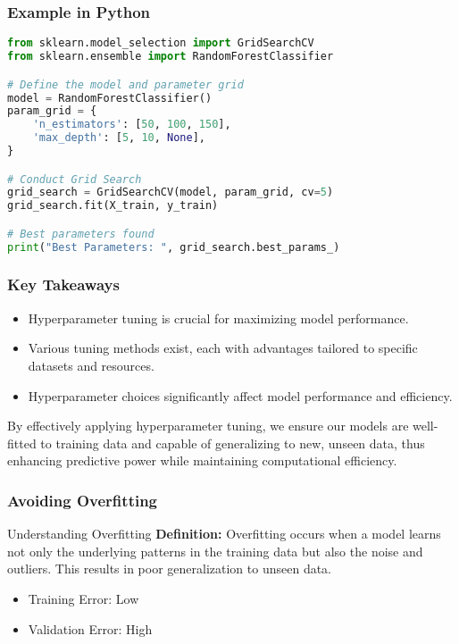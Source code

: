 \documentclass{beamer}
\begin{document}
\begin{frame}[fragile]
    \frametitle{Example in Python}
    \begin{lstlisting}[language=Python]
from sklearn.model_selection import GridSearchCV
from sklearn.ensemble import RandomForestClassifier

# Define the model and parameter grid
model = RandomForestClassifier()
param_grid = {
    'n_estimators': [50, 100, 150],
    'max_depth': [5, 10, None],
}

# Conduct Grid Search
grid_search = GridSearchCV(model, param_grid, cv=5)
grid_search.fit(X_train, y_train)

# Best parameters found
print("Best Parameters: ", grid_search.best_params_)
    \end{lstlisting}
\end{frame}

\begin{frame}[fragile]
    \frametitle{Key Takeaways}
    \begin{itemize}
        \item Hyperparameter tuning is crucial for maximizing model performance.
        \item Various tuning methods exist, each with advantages tailored to specific datasets and resources.
        \item Hyperparameter choices significantly affect model performance and efficiency.
    \end{itemize}
    By effectively applying hyperparameter tuning, we ensure our models are well-fitted to training data and capable of generalizing to new, unseen data, thus enhancing predictive power while maintaining computational efficiency.
\end{frame}

\begin{frame}[fragile]
    \frametitle{Avoiding Overfitting}
    \begin{block}{Understanding Overfitting}
        \textbf{Definition:} Overfitting occurs when a model learns not only the underlying patterns in the training data but also the noise and outliers. This results in poor generalization to unseen data.
    \end{block}
    
    \begin{itemize}
        \item Training Error: Low
        \item Validation Error: High
    \end{itemize}
\end{frame}
\end{document}

